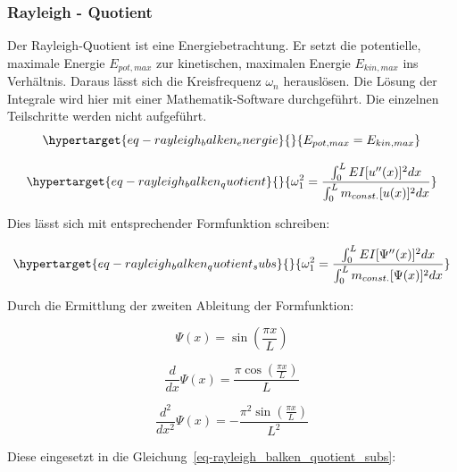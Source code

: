 \documentclass[
  letterpaper,
  DIV=11]{scrreprt}
\begin{document}
\hypertarget{rayleigh---quotient-1}{%
\subsubsection{Rayleigh - Quotient}\label{rayleigh---quotient-1}}

Der Rayleigh-Quotient ist eine Energiebetrachtung. Er setzt die
potentielle, maximale Energie \(E_{pot,max}\) zur kinetischen, maximalen
Energie \(E_{kin,max}\) ins Verhältnis. Daraus lässt sich die
Kreisfrequenz \(\omega_n\) herauslösen. Die Lösung der Integrale wird
hier mit einer Mathematik-Software durchgeführt. Die einzelnen
Teilschritte werden nicht aufgeführt.
\begin{equation}\protect\hypertarget{eq-rayleigh_balken_energie}{}{
E_{pot,max} = E_{kin,max}
}\label{eq-rayleigh_balken_energie}\end{equation}

\begin{equation}\protect\hypertarget{eq-rayleigh_balken_quotient}{}{
\omega_1^2 = \frac{\int_0^L EI[u''(x)]^2 dx}{\int_0^L m_{const.}[u(x)]^2 dx}
}\label{eq-rayleigh_balken_quotient}\end{equation}

Dies lässt sich mit entsprechender Formfunktion schreiben:

\begin{equation}\protect\hypertarget{eq-rayleigh_balken_quotient_subs}{}{
\omega_1^2 = \frac{\int_0^L EI[\Psi''(x)]^2 dx}{\int_0^L m_{const.}[\Psi(x)]^2 dx}
}\label{eq-rayleigh_balken_quotient_subs}\end{equation}

Durch die Ermittlung der zweiten Ableitung der Formfunktion:

\begin{equation}\Psi{\left(x \right)} = \sin{\left(\frac{\pi x}{L} \right)}\end{equation}

\begin{equation}\frac{d}{d x} \Psi{\left(x \right)} = \frac{\pi \cos{\left(\frac{\pi x}{L} \right)}}{L}\end{equation}

\begin{equation}\frac{d^{2}}{d x^{2}} \Psi{\left(x \right)} = - \frac{\pi^{2} \sin{\left(\frac{\pi x}{L} \right)}}{L^{2}}\end{equation}

Diese eingesetzt in die
Gleichung~\ref{eq-rayleigh_balken_quotient_subs}:
\end{document}
